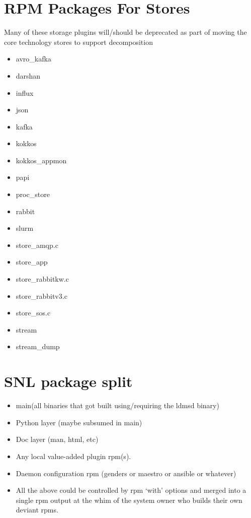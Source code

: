 \documentclass{article}
\begin{document}
    \section{RPM Packages For Stores}
        Many of these storage plugins will/should be deprecated as part of moving the core technology stores to support decomposition
        \begin{itemize}
            \item avro\_kafka
            \item darshan
            \item influx
            \item json
            \item kafka
            \item kokkos
            \item kokkos\_appmon
            \item papi
            \item proc\_store
            \item rabbit
            \item slurm
            \item store\_amqp.c
            \item store\_app
            \item store\_rabbitkw.c
            \item store\_rabbitv3.c
            \item store\_sos.c
            \item stream
            \item stream\_dump
        \end{itemize}
    \section{SNL package split}
        \begin{itemize}
            \item main(all binaries that got built using/requiring the ldmsd binary)
            \item Python layer (maybe subsumed in main)
            \item Doc layer (man, html, etc)
            \item Any local value-added plugin rpm(s).
            \item Daemon configuration rpm (genders or maestro or ansible or whatever)
            \item All the above could be controlled by rpm ‘with’ options and merged into a single rpm output at the whim of the system owner who builds their own deviant rpms.
        \end{itemize}
\end{document}
